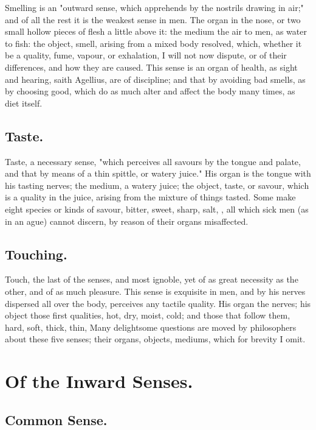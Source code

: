 Smelling is an "outward sense, which apprehends by the nostrils drawing in
air;" and of all the rest it is the weakest sense in men. The organ in the
nose, or two small hollow pieces of flesh a little above it: the medium the air
to men, as water to fish: the object, smell, arising from a mixed body
resolved, which, whether it be a quality, fume, vapour, or exhalation, I will
not now dispute, or of their differences, and how they are caused. This sense
is an organ of health, as sight and hearing, saith
Agellius, are of discipline; and that by avoiding bad
smells, as by choosing good, which do as much alter and affect the body many
times, as diet itself.

\subsection{Taste.}

Taste, a necessary sense, "which perceives all savours by the tongue and
palate, and that by means of a thin spittle, or watery juice." His organ is the
tongue with his tasting nerves; the medium, a watery juice; the object, taste,
or savour, which is a quality in the juice, arising from the mixture of things
tasted. Some make eight species or kinds of savour, bitter, sweet, sharp, salt,
\etc{}, all which sick men (as in an ague) cannot discern, by reason of their
organs misaffected.

\subsection{Touching.}

Touch, the last of the senses, and most ignoble, yet of as great necessity as
the other, and of as much pleasure. This sense is exquisite in men, and by his
nerves dispersed all over the body, perceives any tactile quality. His organ
the nerves; his object those first qualities, hot, dry, moist, cold; and those
that follow them, hard, soft, thick, thin, \etc{} Many delightsome questions
are moved by philosophers about these five senses; their organs, objects,
mediums, which for brevity I omit.

\section{Of the Inward Senses.}

\subsection{Common Sense.}

